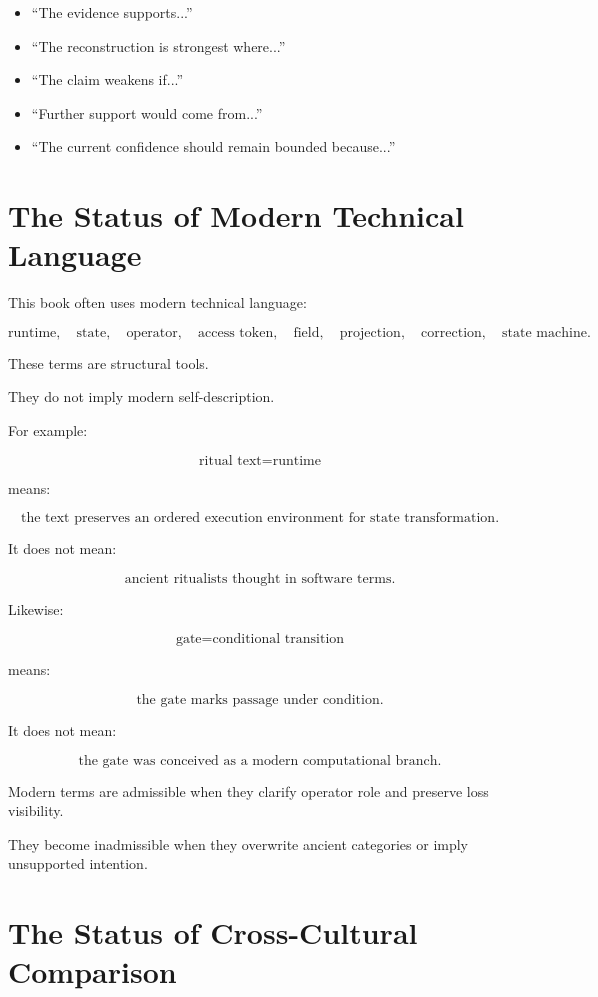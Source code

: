 \documentclass[11pt]{book}
\begin{document}
\begin{itemize}
    \item ``The evidence supports...''
    \item ``The reconstruction is strongest where...''
    \item ``The claim weakens if...''
    \item ``Further support would come from...''
    \item ``The current confidence should remain bounded because...''
\end{itemize}

\section{The Status of Modern Technical Language}

This book often uses modern technical language:

\[
\text{runtime},
\quad
\text{state},
\quad
\text{operator},
\quad
\text{access token},
\quad
\text{field},
\quad
\text{projection},
\quad
\text{correction},
\quad
\text{state machine}.
\]

These terms are structural tools.

They do not imply modern self-description.

For example:

\[
\text{ritual text} = \text{runtime}
\]

means:

\[
\text{the text preserves an ordered execution environment for state transformation}.
\]

It does not mean:

\[
\text{ancient ritualists thought in software terms}.
\]

Likewise:

\[
\text{gate} = \text{conditional transition}
\]

means:

\[
\text{the gate marks passage under condition}.
\]

It does not mean:

\[
\text{the gate was conceived as a modern computational branch}.
\]

Modern terms are admissible when they clarify operator role and preserve loss visibility.

They become inadmissible when they overwrite ancient categories or imply unsupported intention.

\section{The Status of Cross-Cultural Comparison}
\end{document}
